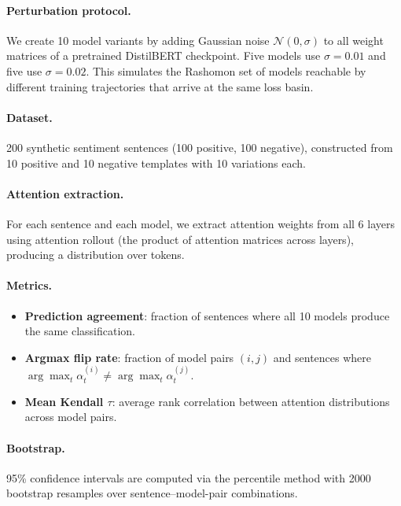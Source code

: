 \documentclass[11pt,a4paper]{article}
\begin{document}
\paragraph{Perturbation protocol.}
We create 10 model variants by adding Gaussian noise $\mathcal{N}(0, \sigma)$
to all weight matrices of a pretrained DistilBERT checkpoint.  Five models use
$\sigma = 0.01$ and five use $\sigma = 0.02$.  This simulates the Rashomon set
of models reachable by different training trajectories that arrive at the same
loss basin.

\paragraph{Dataset.}
200 synthetic sentiment sentences (100 positive, 100 negative), constructed
from 10 positive and 10 negative templates with 10 variations each.

\paragraph{Attention extraction.}
For each sentence and each model, we extract attention weights from all 6 layers
using attention rollout (the product of attention matrices across layers),
producing a distribution over tokens.

\paragraph{Metrics.}
\begin{itemize}[nosep]
  \item \textbf{Prediction agreement}: fraction of sentences where all 10 models
    produce the same classification.
  \item \textbf{Argmax flip rate}: fraction of model pairs $(i,j)$ and sentences
    where $\arg\max_t \alpha^{(i)}_t \neq \arg\max_t \alpha^{(j)}_t$.
  \item \textbf{Mean Kendall $\tau$}: average rank correlation between attention
    distributions across model pairs.
\end{itemize}

\paragraph{Bootstrap.}
95\% confidence intervals are computed via the percentile method with 2000
bootstrap resamples over sentence--model-pair combinations.
\end{document}
